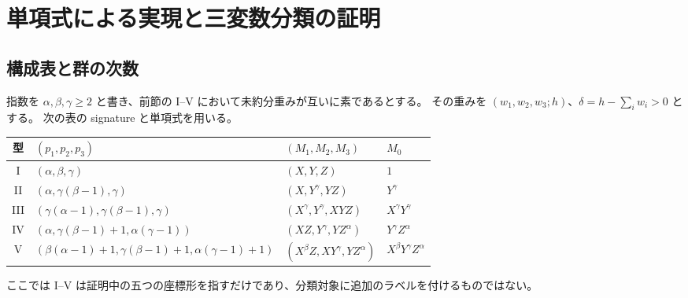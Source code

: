 \documentclass[11pt,a4paper]{ltjsarticle}
\numberwithin{equation}{section}
\theoremstyle{definition}
\begin{document}
\section{単項式による実現と三変数分類の証明}\label{sec:cox}
\subsection{構成表と群の次数}
指数を $\alpha,\beta,\gamma\ge2$ と書き、前節の I--V において未約分重みが互いに素であるとする。
その重みを $(w_1,w_2,w_3;h)$、$\delta=h-\sum_iw_i>0$ とする。
次の表の signature と単項式を用いる。
\begin{center}\small
\begin{tabular}{clll}
\toprule
型 & $(p_1,p_2,p_3)$ & $(M_1,M_2,M_3)$ & $M_0$\\\midrule
I & $(\alpha,\beta,\gamma)$ & $(X,Y,Z)$ & $1$\\
II & $(\alpha,\gamma(\beta-1),\gamma)$ & $(X,Y^\gamma,YZ)$ & $Y^\gamma$\\
III & $(\gamma(\alpha-1),\gamma(\beta-1),\gamma)$ & $(X^\gamma,Y^\gamma,XYZ)$ & $X^\gamma Y^\gamma$\\
IV & $(\alpha,\gamma(\beta-1)+1,\alpha(\gamma-1))$ & $(XZ,Y^\gamma,YZ^\alpha)$ & $Y^\gamma Z^\alpha$\\
V & $(\beta(\alpha-1)+1,\gamma(\beta-1)+1,\alpha(\gamma-1)+1)$ & $(X^\beta Z,XY^\gamma,YZ^\alpha)$ & $X^\beta Y^\gamma Z^\alpha$\\\bottomrule
\end{tabular}
\end{center}
ここでは I--V は証明中の五つの座標形を指すだけであり、分類対象に追加のラベルを付けるものではない。
\end{document}
